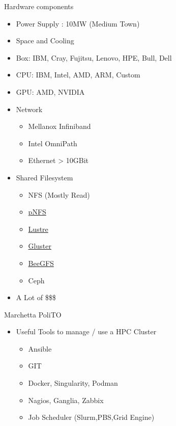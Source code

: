 \documentclass[ignorenonframetext,]{beamer}
\providecommand{\tightlist}{%
  \setlength{\itemsep}{0pt}\setlength{\parskip}{0pt}}
\begin{document}
\begin{frame}{Hardware components}

\begin{itemize}
\tightlist
\item
  Power Supply : 10MW (Medium Town)
\item
  Space and Cooling
\item
  Box: IBM, Cray, Fujitsu, Lenovo, HPE, Bull, Dell
\item
  CPU: IBM, Intel, AMD, ARM, Custom
\item
  GPU: AMD, NVIDIA
\item
  Network

  \begin{itemize}
  \tightlist
  \item
    Mellanox Infiniband
  \item
    Intel OmniPath
  \item
    Ethernet \textgreater{} 10GBit
  \end{itemize}

\item
  Shared Filesystem

  \begin{itemize}
  \tightlist
  \item
    NFS (Mostly Read)
  \item
    \href{http://www.pnfs.com/}{pNFS}
  \item
    \href{http://lustre.org/}{Lustre}
  \item
    \href{https://www.gluster.org/}{Gluster}
  \item
    \href{https://www.beegfs.io/content/}{BeeGFS}
  \item
    Ceph
  \end{itemize}

\item
  A Lot of \$\$\$
\end{itemize}


\end{frame}

\begin{frame}{Marchetta PoliTO}

\begin{itemize}
\tightlist
\item
  Useful Tools to manage / use a HPC Cluster

  \begin{itemize}
  \tightlist
  \item
    Ansible
  \item
    GIT
  \item
    Docker, Singularity, Podman
  \item
    Nagios, Ganglia, Zabbix
  \item
    Job Scheduler (Slurm,PBS,Grid Engine)
  \end{itemize}

\end{itemize}


\end{frame}
\end{document}
